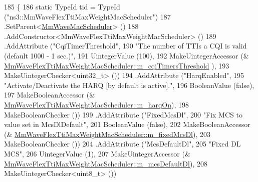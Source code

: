 \begin{DoxyCode}
185 \{
186         \textcolor{keyword}{static} TypeId tid = TypeId (\textcolor{stringliteral}{"ns3::MmWaveFlexTtiMaxWeightMacScheduler"})
187             .SetParent<\hyperlink{classns3_1_1MmWaveMacScheduler_aad32d6753e98fe1699402d1a722835c4}{MmWaveMacScheduler}> ()
188                 .AddConstructor<MmWaveFlexTtiMaxWeightMacScheduler> ()
189     .AddAttribute (\textcolor{stringliteral}{"CqiTimerThreshold"},
190                    \textcolor{stringliteral}{"The number of TTIs a CQI is valid (default 1000 - 1 sec.)"},
191                    UintegerValue (100),
192                    MakeUintegerAccessor (&
      \hyperlink{classns3_1_1MmWaveFlexTtiMaxWeightMacScheduler_a12853e0079042ba54793594532d1ef15}{MmWaveFlexTtiMaxWeightMacScheduler::m\_cqiTimersThreshold}
      ),
193                    MakeUintegerChecker<uint32\_t> ())
194     .AddAttribute (\textcolor{stringliteral}{"HarqEnabled"},
195                    \textcolor{stringliteral}{"Activate/Deactivate the HARQ [by default is active]."},
196                    BooleanValue (\textcolor{keyword}{false}),
197                    MakeBooleanAccessor (&
      \hyperlink{classns3_1_1MmWaveFlexTtiMaxWeightMacScheduler_af63eec946bdf0fb2db0c66104e95f1a6}{MmWaveFlexTtiMaxWeightMacScheduler::m\_harqOn}),
198                    MakeBooleanChecker ())
199          .AddAttribute (\textcolor{stringliteral}{"FixedMcsDl"},
200                                                                         \textcolor{stringliteral}{"Fix MCS to value set in
       McsDlDefault"},
201                                                                         BooleanValue (\textcolor{keyword}{false}),
202                                                                         MakeBooleanAccessor (&
      \hyperlink{classns3_1_1MmWaveFlexTtiMaxWeightMacScheduler_abb5583e84ade8989145fffde5a7b7e05}{MmWaveFlexTtiMaxWeightMacScheduler::m\_fixedMcsDl}),
203                                                                         MakeBooleanChecker ())
204         .AddAttribute (\textcolor{stringliteral}{"McsDefaultDl"},
205                                                                  \textcolor{stringliteral}{"Fixed DL MCS"},
206                                                                  UintegerValue (1),
207                                                                  MakeUintegerAccessor (&
      \hyperlink{classns3_1_1MmWaveFlexTtiMaxWeightMacScheduler_a5251abb5991c06c345317bc7d5ff32e8}{MmWaveFlexTtiMaxWeightMacScheduler::m\_mcsDefaultDl}),
208                                                                  MakeUintegerChecker<uint8\_t> ())

\end{DoxyCode}

